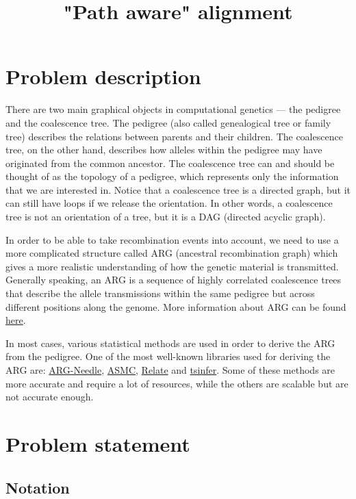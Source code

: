 \documentclass[14pt]{extarticle}
\begin{document}
	
	
\title{"Path aware" alignment}
\date{}

\section{Problem description}

There are two main graphical objects in computational genetics --- the pedigree and the coalescence tree. The pedigree (also called genealogical tree or family tree) describes the relations between parents and their children. The coalescence tree, on the other hand, describes how alleles within the pedigree may have originated from the common ancestor. The coalescence tree can and should be thought of as the topology of a pedigree, which represents only the information that we are interested in. Notice that a coalescence tree is a directed graph, but it can still have loops if we release the orientation. In other words, a coalescence tree is not an orientation of a tree, but it is a DAG (directed acyclic graph).

In order to be able to take recombination events into account, we need to use a more complicated structure called ARG (ancestral recombination graph) which gives a more realistic understanding of how the genetic material is transmitted. Generally speaking, an ARG is a sequence of highly correlated coalescence trees that describe the allele transmissions within the same pedigree but across different positions along the genome.  More information about ARG can be found \href{https://nielsen-lab.github.io/pdfs/papers/argeval.pdf}{here}. 

In most cases, various statistical methods are used in order to derive the ARG from the pedigree. One of the most well-known libraries used for deriving the ARG are: \href{https://palamaralab.github.io/software/argneedle/}{ARG-Needle}, \href{https://palamaralab.github.io/software/asmc/}{ASMC}, \href{https://myersgroup.github.io/relate/}{Relate} and \href{https://www.ncbi.nlm.nih.gov/pmc/articles/PMC6726478/}{tsinfer}. Some of these methods are more accurate and require a lot of resources, while the others are scalable but are not accurate enough.


\section{Problem statement}

\subsection{Notation}
\end{document}
